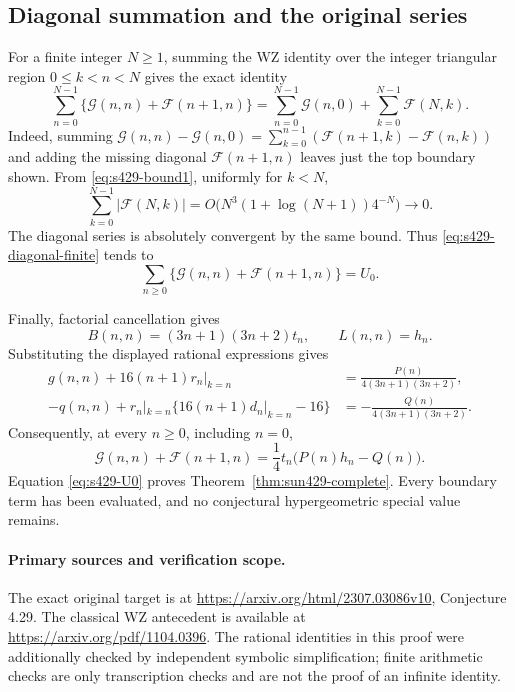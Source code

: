 \documentclass[11pt,a4paper]{article}
\theoremstyle{remark}\newtheorem{remark}[theorem]{Remark}
\numberwithin{equation}{section}
\begin{document}
\subsection{Diagonal summation and the original series}
For a finite integer $N\ge1$, summing the WZ identity over the
integer triangular region $0\le k<n<N$ gives the exact identity
\begin{equation}\label{eq:s429-diagonal-finite}
 \sum_{n=0}^{N-1}
 \{\mathcal G(n,n)+\mathcal F(n+1,n)\}
 =\sum_{n=0}^{N-1}\mathcal G(n,0)
   +\sum_{k=0}^{N-1}\mathcal F(N,k).
\end{equation}
Indeed, summing
$\mathcal G(n,n)-\mathcal G(n,0)
=\sum_{k=0}^{n-1}(\mathcal F(n+1,k)-\mathcal F(n,k))$
and adding the missing diagonal $\mathcal F(n+1,n)$ leaves just the
top boundary shown. From \eqref{eq:s429-bound1}, uniformly for $k<N$,
\[
 \sum_{k=0}^{N-1}|\mathcal F(N,k)|
 =O\bigl(N^3(1+\log(N+1))4^{-N}\bigr)\longrightarrow0.
\]
The diagonal series is absolutely convergent by the same bound.
Thus \eqref{eq:s429-diagonal-finite} tends to
\[
 \sum_{n\ge0}\{\mathcal G(n,n)+\mathcal F(n+1,n)\}=U_0.
\]

Finally, factorial cancellation gives
\[
 B(n,n)=(3n+1)(3n+2)t_n,
 \qquad L(n,n)=h_n.
\]
Substituting the displayed rational expressions gives
\begin{align*}
 g(n,n)+16(n+1)r_n|_{k=n}
 &=\frac{P(n)}{4(3n+1)(3n+2)},\\
 -q(n,n)+r_n|_{k=n}\{16(n+1)d_n|_{k=n}-16\}
 &=-\frac{Q(n)}{4(3n+1)(3n+2)}.
\end{align*}
Consequently, at every $n\ge0$, including $n=0$,
\[
 \mathcal G(n,n)+\mathcal F(n+1,n)
 =\frac14t_n\bigl(P(n)h_n-Q(n)\bigr).
\]
Equation \eqref{eq:s429-U0} proves
Theorem~\ref{thm:sun429-complete}. Every boundary term has been
evaluated, and no conjectural hypergeometric special value remains.

\paragraph{Primary sources and verification scope.}
The exact original target is at
\url{https://arxiv.org/html/2307.03086v10}, Conjecture 4.29.
The classical WZ antecedent is available at
\url{https://arxiv.org/pdf/1104.0396}.
The rational identities in this proof were additionally checked by
independent symbolic simplification; finite arithmetic checks are only
transcription checks and are not the proof of an infinite identity.

\clearpage
\end{document}
